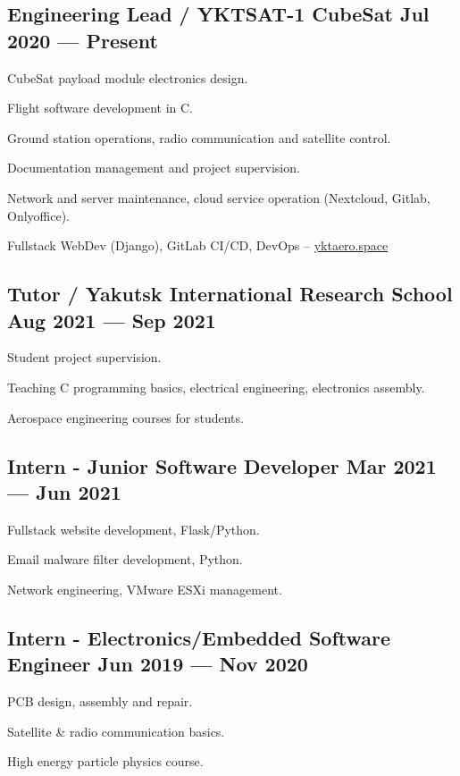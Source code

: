 \documentclass[letter,10pt]{article}
\begin{document}
\subsection{{Engineering Lead / YKTSAT-1 CubeSat \hfill Jul 2020 --- Present}}
\begin{zitemize}
\item CubeSat payload module electronics design.
\item Flight software development in C.
\item Ground station operations, radio communication and satellite control.
\item Documentation management and project supervision.
\item Network and server maintenance, cloud service operation (Nextcloud, Gitlab, Onlyoffice).
\item Fullstack WebDev (Django), GitLab CI/CD, DevOps -- \url{yktaero.space}
\end{zitemize}

\subsection{{Tutor / Yakutsk International Research School \hfill Aug 2021 --- Sep 2021}}
\begin{zitemize}
\item Student project supervision.
\item Teaching C programming basics, electrical engineering, electronics assembly.
\item Aerospace engineering courses for students.
\end{zitemize}

\subsection{{Intern - Junior Software Developer \hfill Mar 2021 --- Jun 2021}}
\begin{zitemize}
\item Fullstack website development, Flask/Python.
\item Email malware filter development, Python.
\item Network engineering, VMware ESXi management.
\end{zitemize}

\subsection{{Intern - Electronics/Embedded Software Engineer \hfill Jun 2019 --- Nov 2020}}
\begin{zitemize}
\item PCB design, assembly and repair.
\item Satellite \& radio communication basics.
\item High energy particle physics course.
\end{zitemize}
\end{document}

